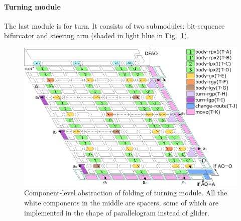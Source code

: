 			\paragraph{Turning module}
%
The last module is for turn. 
It consists of two submodules: bit-sequence bifurcator and steering arm (shaded in light blue in Fig.~\ref{fig:overall_turning}). 

\begin{figure}[t]
\centering
\includegraphics[width=\linewidth]{pic/overall_turn_part.pdf}
\caption{
Component-level abstraction of folding of turning module.
All the white components in the middle are spacers, some of which are implemented in the shape of parallelogram instead of glider. 
 }
\label{fig:overall_turning}
\end{figure}

